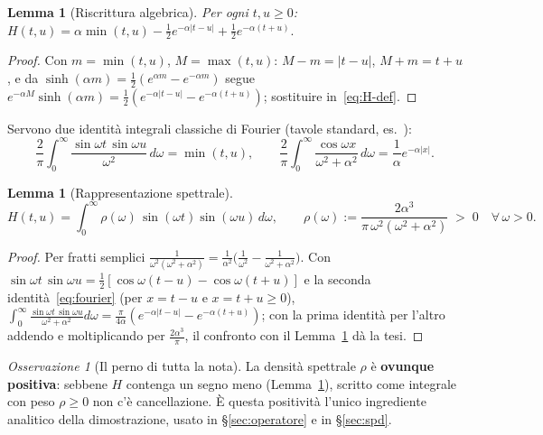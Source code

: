 \documentclass[11pt,a4paper]{article}
\theoremstyle{plain}
\newtheorem{lemma}[teorema]{Lemma}
\theoremstyle{remark}
\newtheorem*{osservazione}{Osservazione}
\begin{document}
\begin{lemma}[Riscrittura algebrica]
\label{lem:algebrico}
Per ogni $t,u\ge0$:\quad
$H(t,u) = \alpha\min(t,u) - \tfrac12 e^{-\alpha|t-u|} + \tfrac12 e^{-\alpha(t+u)}.$
\end{lemma}
\begin{proof}
Con $m=\min(t,u)$, $M=\max(t,u)$: $M-m=|t-u|$, $M+m=t+u$, e da
$\sinh(\alpha m)=\tfrac12(e^{\alpha m}-e^{-\alpha m})$ segue
$e^{-\alpha M}\sinh(\alpha m)=\tfrac12(e^{-\alpha|t-u|}-e^{-\alpha(t+u)})$; sostituire
in~\eqref{eq:H-def}.
\end{proof}

Servono due identit\`a integrali classiche di Fourier (tavole standard, es.\
\cite{gradshteyn2007,bracewell2000}):
\begin{equation}
  \frac{2}{\pi}\!\int_0^\infty\! \frac{\sin\omega t\,\sin\omega u}{\omega^2}\,d\omega = \min(t,u),
  \qquad
  \frac{2}{\pi}\!\int_0^\infty\! \frac{\cos\omega x}{\omega^2+\alpha^2}\,d\omega = \frac{1}{\alpha}e^{-\alpha|x|}.
  \label{eq:fourier}
\end{equation}

\begin{lemma}[Rappresentazione spettrale]
\label{lem:spettrale}
\[
  H(t,u) = \int_0^\infty \rho(\omega)\,\sin(\omega t)\sin(\omega u)\,d\omega,
  \qquad
  \rho(\omega):=\frac{2\alpha^3}{\pi\,\omega^2(\omega^2+\alpha^2)}\;>\;0\quad\forall\,\omega>0.
\]
\end{lemma}
\begin{proof}
Per fratti semplici $\tfrac{1}{\omega^2(\omega^2+\alpha^2)}=\tfrac1{\alpha^2}\bigl(\tfrac1{\omega^2}
-\tfrac1{\omega^2+\alpha^2}\bigr)$. Con $\sin\omega t\,\sin\omega u=\tfrac12[\cos\omega(t-u)-\cos\omega(t+u)]$
e la seconda identit\`a~\eqref{eq:fourier} (per $x=t-u$ e $x=t+u\ge0$),
$\int_0^\infty\tfrac{\sin\omega t\,\sin\omega u}{\omega^2+\alpha^2}d\omega=\tfrac{\pi}{4\alpha}
(e^{-\alpha|t-u|}-e^{-\alpha(t+u)})$; con la prima identit\`a per l'altro addendo e moltiplicando
per $\tfrac{2\alpha^3}{\pi}$, il confronto con il Lemma~\ref{lem:algebrico} d\`a la tesi.
\end{proof}

\begin{osservazione}[Il perno di tutta la nota]
La densit\`a spettrale $\rho$ \`e \textbf{ovunque positiva}: sebbene $H$ contenga un segno meno
(Lemma~\ref{lem:algebrico}), scritto come integrale con peso $\rho\ge0$ non c'\`e cancellazione.
\`E questa positivit\`a l'unico ingrediente analitico della dimostrazione, usato in
§\ref{sec:operatore} e in §\ref{sec:spd}.
\end{osservazione}
\end{document}
